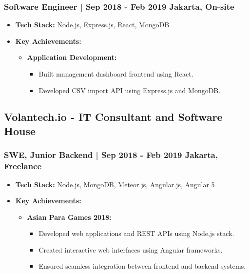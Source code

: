 \documentclass[11pt]{article}
\begin{document}
\subsubsection{Software Engineer | Sep 2018 - Feb 2019 \hfill Jakarta, On-site}
\begin{itemize}
    \item \textbf{Tech Stack:} Node.js, Express.js, React, MongoDB
    \item \textbf{Key Achievements:}
    \begin{itemize}
        \item \textbf{Application Development:}
        \begin{itemize}
            \item Built management dashboard frontend using React.
            \item Developed CSV import API using Express.js and MongoDB.
        \end{itemize}
    \end{itemize}
\end{itemize}

\subsection{Volantech.io - IT Consultant and Software House}
\subsubsection{SWE, Junior Backend | Sep 2018 - Feb 2019 \hfill Jakarta, Freelance}
\begin{itemize}
    \item \textbf{Tech Stack:} Node.js, MongoDB, Meteor.js, Angular.js, Angular 5
    \item \textbf{Key Achievements:}
    \begin{itemize}
        \item \textbf{Asian Para Games 2018:}
        \begin{itemize}
            \item Developed web applications and REST APIs using Node.js stack.
            \item Created interactive web interfaces using Angular frameworks.
            \item Ensured seamless integration between frontend and backend systems.
        \end{itemize}
    \end{itemize}
\end{itemize}
\end{document}
